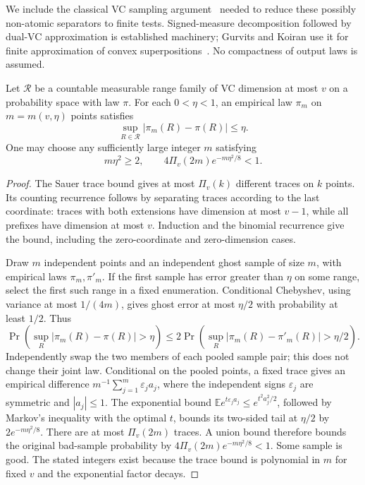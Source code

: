 We include the classical VC sampling argument~\citep{VC} needed to reduce these possibly non-atomic separators to finite tests. Signed-measure decomposition followed by dual-VC approximation is established machinery; Gurvits and Koiran use it for finite approximation of convex superpositions~\citep{GK}. No compactness of output laws is assumed.

\begin{lemma}\label{ov:vc}
Let $\mathcal R$ be a countable measurable range family of VC dimension at most $v$ on a probability space with law $\pi$. For each $0<\eta<1$, an empirical law $\pi_m$ on $m=m(v,\eta)$ points satisfies
\[
 \sup_{R\in\mathcal R}|\pi_m(R)-\pi(R)|\le\eta.
\]
One may choose any sufficiently large integer $m$ satisfying
\[
 m\eta^2\ge2,\qquad 4\Pi_v(2m)e^{-m\eta^2/8}<1.
\]
\end{lemma}
\begin{proof}
The Sauer trace bound gives at most $\Pi_v(k)$ different traces on $k$ points. Its counting recurrence follows by separating traces according to the last coordinate: traces with both extensions have dimension at most $v-1$, while all prefixes have dimension at most $v$. Induction and the binomial recurrence give the bound, including the zero-coordinate and zero-dimension cases.

Draw $m$ independent points and an independent ghost sample of size $m$, with empirical laws $\pi_m,\pi'_m$. If the first sample has error greater than $\eta$ on some range, select the first such range in a fixed enumeration. Conditional Chebyshev, using variance at most $1/(4m)$, gives ghost error at most $\eta/2$ with probability at least $1/2$. Thus
\[
 \Pr\!\left(\sup_R|\pi_m(R)-\pi(R)|>\eta\right)
 \le2\Pr\!\left(\sup_R|\pi_m(R)-\pi'_m(R)|>\eta/2\right).
\]
Independently swap the two members of each pooled sample pair; this does not change their joint law. Conditional on the pooled points, a fixed trace gives an empirical difference $m^{-1}\sum_{j=1}^m\varepsilon_j a_j$, where the independent signs $\varepsilon_j$ are symmetric and $|a_j|\le1$. The exponential bound $\mathbb E e^{t\varepsilon_j a_j}\le e^{t^2a_j^2/2}$, followed by Markov's inequality with the optimal $t$, bounds its two-sided tail at $\eta/2$ by $2e^{-m\eta^2/8}$. There are at most $\Pi_v(2m)$ traces. A union bound therefore bounds the original bad-sample probability by $4\Pi_v(2m)e^{-m\eta^2/8}<1$. Some sample is good. The stated integers exist because the trace bound is polynomial in $m$ for fixed $v$ and the exponential factor decays.
\end{proof}

